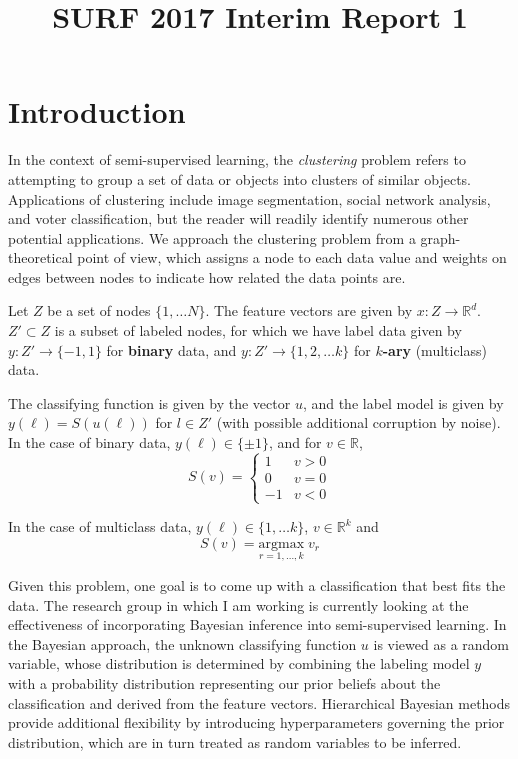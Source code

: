\documentclass{siamart1116}
\title{SURF 2017 Interim Report 1}
\author{\TheAuthors}
\date{}
\begin{document}
\maketitle
\setlength{\unitlength}{1in}
\setlength{\parindent}{0in}

\section{Introduction}
In the context of semi-supervised learning, the \textit{clustering} problem refers to attempting to group a set of data or objects into clusters of similar objects. Applications of clustering include image segmentation, social network analysis, and voter classification, but the reader will readily identify numerous other potential applications. We approach the clustering problem from a graph-theoretical point of view, which assigns a node to each data value and weights on edges between nodes to indicate how related the data points are.

Let $Z$ be a set of nodes $\{1, \ldots N\}$. The feature vectors are given by $x : Z \rightarrow \mathbb{R}^d$. $Z' \subset Z$ is a subset of labeled nodes, for which we have label data given by $y : Z' \to \{-1, 1\}$ for {\bf binary} data, and $y : Z' \to \{1,2,\ldots k\}$ for {\bf $k$-ary} (multiclass) data.


The classifying function is given by the vector $u$, and the label model is given by $y(\ell) = S(u(\ell))$ for $l \in Z'$ (with possible additional corruption by noise). In the case of binary data, $y(\ell) \in \{\pm 1\}$, and for $v \in \mathbb{R}$,
\[
S(v) = \begin{cases}
1 & v>0\\
0 & v=0\\
-1 & v<0
\end{cases}
\]

In the case of multiclass data, $y(\ell) \in \{1, \ldots k\}$, $v \in \mathbb{R}^k$ and
\[
S(v) = \underset{r =1,\ldots,k}{\mathrm{argmax}}\;v_r
\]

Given this problem, one goal is to come up with a classification that best fits the data. The research group in which I am working is currently looking at the effectiveness of incorporating Bayesian inference into semi-supervised learning. In the Bayesian approach, the unknown classifying function $u$ is viewed as a random variable, whose distribution is determined by combining the labeling model $y$ with a probability distribution representing our prior beliefs about the classification and derived from the feature vectors. Hierarchical Bayesian methods provide additional flexibility by introducing hyperparameters governing the prior distribution, which are in turn treated as random variables to be inferred.
\end{document}
